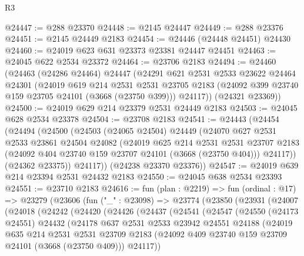 \begin{lexlean}{R3}
\begin{coremodule}
@24447 := @288 @23370
@24448 := @2145 @24447
@24449 := @288 @23376
@24451 := @2145 @24449 @2183
@24454 := @24446 (@24448 @24451) @24430
@24460 := @24019 @623 @631 @23373 @23381 @24447 @24451
@24463 := @24045 @622 @2534 @23372
@24464 := @23706 @2183
@24494 := @24460
    (@24463
      (@24286 @24464)
      @24447
      (@24291
        @621
        @2531
        @2533
        @23622
        @24464
        @24301
        (@24019
          @619
          @214
          @2531
          @2531
          @23705
          @2183
          (@24092 @399 @23740 @159 @23705 @24101 (@3668 (@23750 @399)))
          @24117))
      (@24321 @23369))
@24500 := @24019 @629 @214 @23379 @2531 @24449 @2183
@24503 := @24045 @628 @2534 @23378
@24504 := @23708 @2183
@24541 := @24443
    (@24454
      (@24494
        (@24500
          (@24503
            (@24065 @24504)
            @24449
            (@24070
              @627
              @2531
              @2533
              @23861
              @24504
              @24082
              (@24019
                @625
                @214
                @2531
                @2531
                @23707
                @2183
                (@24092 @404 @23740 @159 @23707 @24101 (@3668 (@23750 @404)))
                @24117))
            (@24362 @23375))
          @24117))
      (@24238 @23370 @23376))
@24547 := @24019 @639 @214 @23394 @2531 @24432 @2183
@24550 := @24045 @638 @2534 @23393
@24551 := @23710 @2183
@24616 := fun (plan : @2219) =>
  fun (ordinal : @17) =>
  @23279
    (@23606
      (fun ("_" : @23098) =>
      @23774
        (@23850
          (@23931
            (@24007
              (@24018
                (@24242
                  (@24420
                    (@24426
                      (@24437
                        (@24541
                          (@24547
                            (@24550
                              (@24173 @24551)
                              @24432
                              (@24178
                                @637
                                @2531
                                @2533
                                @23942
                                @24551
                                @24188
                                (@24019
                                  @635
                                  @214
                                  @2531
                                  @2531
                                  @23709
                                  @2183
                                  (@24092 @409 @23740 @159 @23709 @24101 (@3668 (@23750 @409)))
                                  @24117))

\end{coremodule}
\end{lexlean}

